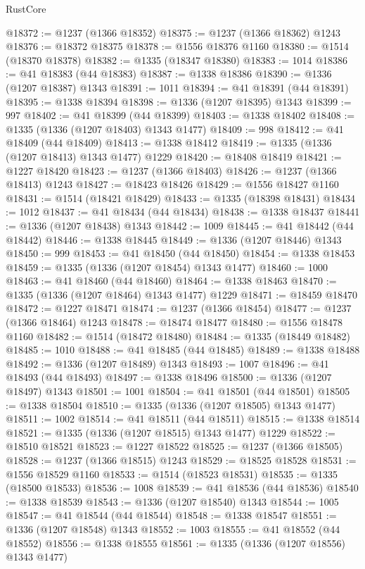 \begin{lexlean}{RustCore}
\begin{coremodule}
@18372 := @1237 (@1366 @18352)
@18375 := @1237 (@1366 @18362) @1243
@18376 := @18372 @18375
@18378 := @1556 @18376 @1160
@18380 := @1514 (@18370 @18378)
@18382 := @1335 (@18347 @18380)
@18383 := 1014
@18386 := @41 @18383 (@44 @18383)
@18387 := @1338 @18386
@18390 := @1336 (@1207 @18387) @1343
@18391 := 1011
@18394 := @41 @18391 (@44 @18391)
@18395 := @1338 @18394
@18398 := @1336 (@1207 @18395) @1343
@18399 := 997
@18402 := @41 @18399 (@44 @18399)
@18403 := @1338 @18402
@18408 := @1335 (@1336 (@1207 @18403) @1343 @1477)
@18409 := 998
@18412 := @41 @18409 (@44 @18409)
@18413 := @1338 @18412
@18419 := @1335 (@1336 (@1207 @18413) @1343 @1477) @1229
@18420 := @18408 @18419
@18421 := @1227 @18420
@18423 := @1237 (@1366 @18403)
@18426 := @1237 (@1366 @18413) @1243
@18427 := @18423 @18426
@18429 := @1556 @18427 @1160
@18431 := @1514 (@18421 @18429)
@18433 := @1335 (@18398 @18431)
@18434 := 1012
@18437 := @41 @18434 (@44 @18434)
@18438 := @1338 @18437
@18441 := @1336 (@1207 @18438) @1343
@18442 := 1009
@18445 := @41 @18442 (@44 @18442)
@18446 := @1338 @18445
@18449 := @1336 (@1207 @18446) @1343
@18450 := 999
@18453 := @41 @18450 (@44 @18450)
@18454 := @1338 @18453
@18459 := @1335 (@1336 (@1207 @18454) @1343 @1477)
@18460 := 1000
@18463 := @41 @18460 (@44 @18460)
@18464 := @1338 @18463
@18470 := @1335 (@1336 (@1207 @18464) @1343 @1477) @1229
@18471 := @18459 @18470
@18472 := @1227 @18471
@18474 := @1237 (@1366 @18454)
@18477 := @1237 (@1366 @18464) @1243
@18478 := @18474 @18477
@18480 := @1556 @18478 @1160
@18482 := @1514 (@18472 @18480)
@18484 := @1335 (@18449 @18482)
@18485 := 1010
@18488 := @41 @18485 (@44 @18485)
@18489 := @1338 @18488
@18492 := @1336 (@1207 @18489) @1343
@18493 := 1007
@18496 := @41 @18493 (@44 @18493)
@18497 := @1338 @18496
@18500 := @1336 (@1207 @18497) @1343
@18501 := 1001
@18504 := @41 @18501 (@44 @18501)
@18505 := @1338 @18504
@18510 := @1335 (@1336 (@1207 @18505) @1343 @1477)
@18511 := 1002
@18514 := @41 @18511 (@44 @18511)
@18515 := @1338 @18514
@18521 := @1335 (@1336 (@1207 @18515) @1343 @1477) @1229
@18522 := @18510 @18521
@18523 := @1227 @18522
@18525 := @1237 (@1366 @18505)
@18528 := @1237 (@1366 @18515) @1243
@18529 := @18525 @18528
@18531 := @1556 @18529 @1160
@18533 := @1514 (@18523 @18531)
@18535 := @1335 (@18500 @18533)
@18536 := 1008
@18539 := @41 @18536 (@44 @18536)
@18540 := @1338 @18539
@18543 := @1336 (@1207 @18540) @1343
@18544 := 1005
@18547 := @41 @18544 (@44 @18544)
@18548 := @1338 @18547
@18551 := @1336 (@1207 @18548) @1343
@18552 := 1003
@18555 := @41 @18552 (@44 @18552)
@18556 := @1338 @18555
@18561 := @1335 (@1336 (@1207 @18556) @1343 @1477)

\end{coremodule}
\end{lexlean}
